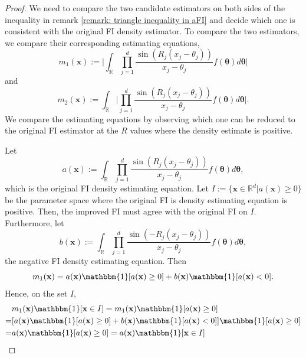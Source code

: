 \documentclass[%
 reprint,
 amsmath,amssymb,
 aps,
]{revtex4-2}
\def\R{\mathbb{R}}
\def\btheta{\boldsymbol{\theta}}
\def\xbold{\mathbf{x}}
\begin{document}
\begin{proof}
    We need to compare the two candidate estimators on both sides of the inequality in remark \ref{remark: triangle inequality in aFI} and decide which one is consistent with the original FI density estimator. To compare the two estimators, we compare their corresponding estimating equations,
    \begin{equation*}
         m_1(\xbold) := \bigg|\int_\R \prod_{j = 1}^d \frac{\sin(R_j(x_j - \theta_j))}{x_j - \theta_j} f(\btheta)d\btheta\bigg|
    \end{equation*}
    and
    \begin{equation*}
        m_2(\xbold) := \int_\R \bigg|\prod_{j = 1}^d \frac{\sin(R_j(x_j - \theta_j))}{x_j - \theta_j} f(\btheta)d\btheta\bigg|.
    \end{equation*}
    We compare the estimating equations by observing which one can be reduced to the original FI estimator at the $R$ values where the density estimate is positive.

    Let
    \begin{equation*}
        a(\xbold) := \int_\R \prod_{j = 1}^d \frac{\sin(R_j(x_j - \theta_j))}{x_j - \theta_j} f(\btheta)d\btheta,
    \end{equation*}
    which is the original FI density estimating equation. Let $I := \{\xbold \in \R^d | a(\xbold) \ge 0\}$ be the parameter space where the original FI is density estimating equation is positive. Then, the improved FI must agree with the original FI on $I$. Furthermore, let
    \begin{equation*}
        b(\xbold) := \int_\R \prod_{j = 1}^d \frac{\sin(-R_j(x_j - \theta_j))}{x_j - \theta_j} f(\btheta)d\btheta,
    \end{equation*}
    the negative FI density estimating equation. Then
    \begin{equation*}
        m_1(\xbold) = a(\xbold)\mathbbm{1}[a(\xbold) \ge 0] + b(\xbold) \mathbbm{1}[a(\xbold) < 0].
    \end{equation*}
    Hence, on the set $I$, 
    \begin{align*}
        & m_1(\xbold)\mathbbm{1}[\xbold \in I] = m_1(\xbold)\mathbbm{1}[a(\xbold) \ge 0] \\
        = & [a(\xbold)\mathbbm{1}[a(\xbold) \ge 0] + b(\xbold) \mathbbm{1}[a(\xbold) < 0]]\mathbbm{1}[a(\xbold) \ge 0] \\
        = & a(\xbold)\mathbbm{1}[a(\xbold) \ge 0] = a(\xbold)\mathbbm{1}[\xbold \in I]
    \end{align*}


\end{proof}
\end{document}
